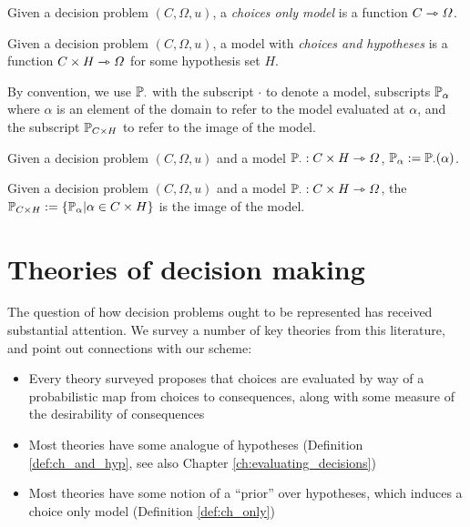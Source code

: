 \begin{definition}\label{def:ch_only}
Given a decision problem $(C,\Omega,u)$, a \emph{choices only model} is a function $C\rightarrowtriangle \Omega$.
\end{definition}

\begin{definition}\label{def:ch_and_hyp}
Given a decision problem $(C,\Omega,u)$, a model with \emph{choices and hypotheses} is a function $C\times H\rightarrowtriangle \Omega$ for some hypothesis set $H$.
\end{definition}



By convention, we use $\mathbb{P}_\cdot$ with the subscript $\cdot$ to denote a model, subscripts $\mathbb{P}_\alpha$ where $\alpha$ is an element of the domain to refer to the model evaluated at $\alpha$, and the subscript $\mathbb{P}_{C\times H}$ to refer to the image of the model.

\begin{notation}[Model]
Given a decision problem $(C,\Omega,u)$ and a model $\mathbb{P}_\cdot:C\times H\rightarrowtriangle \Omega$, $\mathbb{P}_\alpha:=\mathbb{P}_\cdot(\alpha)$.
\end{notation}

\begin{notation}\label{def:induced_pset_1}
Given a decision problem $(C,\Omega,u)$ and a model $\mathbb{P}_\cdot:C\times H\rightarrowtriangle \Omega$, the $\mathbb{P}_{C\times H}:=\{\mathbb{P}_\alpha|\alpha\in C\times H\}$ is the image of the model.
\end{notation}


\section{Theories of decision making}\label{sec:how_represent_conseqeunces}

The question of how decision problems ought to be represented has received substantial attention. We survey a number of key theories from this literature, and point out connections with our scheme:
\begin{itemize}
    \item Every theory surveyed proposes that choices are evaluated by way of a probabilistic map from choices to consequences, along with some measure of the desirability of consequences
    \item Most theories have some analogue of hypotheses (Definition \ref{def:ch_and_hyp}, see also Chapter \ref{ch:evaluating_decisions})
    \item Most theories have some notion of a ``prior'' over hypotheses, which induces a choice only model (Definition \ref{def:ch_only})
\end{itemize}

